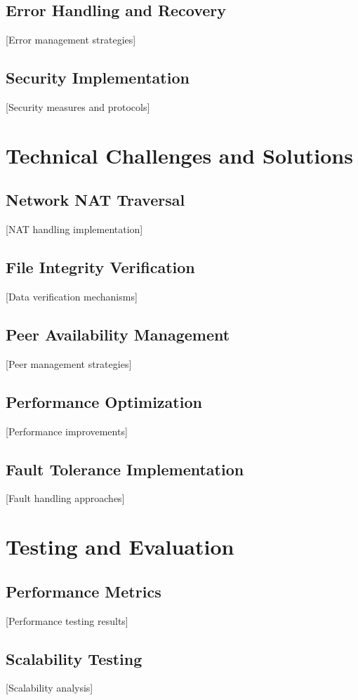 \documentclass[12pt,a4paper]{report}
\begin{document}
\section{Error Handling and Recovery}
 [Error management strategies]

\section{Security Implementation}
 [Security measures and protocols]

\chapter{Technical Challenges and Solutions}
\section{Network NAT Traversal}
 [NAT handling implementation]

\section{File Integrity Verification}
 [Data verification mechanisms]

\section{Peer Availability Management}
 [Peer management strategies]

\section{Performance Optimization}
 [Performance improvements]

\section{Fault Tolerance Implementation}
 [Fault handling approaches]

\chapter{Testing and Evaluation}
\section{Performance Metrics}
 [Performance testing results]

\section{Scalability Testing}
 [Scalability analysis]
\end{document}

